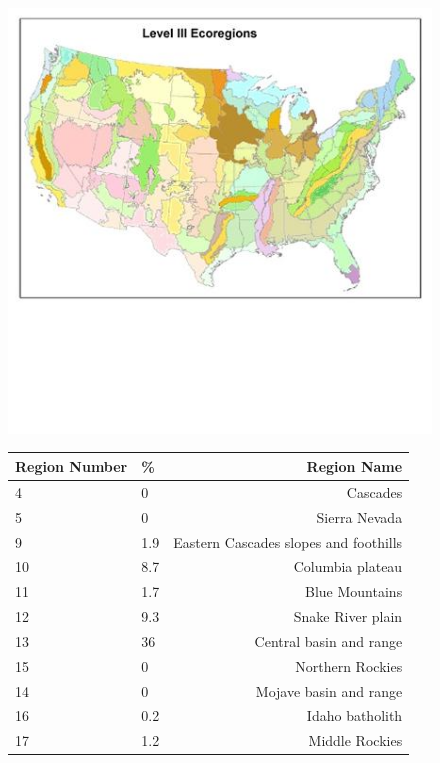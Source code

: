 \def\year{2017}\relax \documentclass[letterpaper]{article}
\begin{document}
  \begin{figure}
  \begin{minipage}[b]{0.49\textwidth}
    \centering
\includegraphics[width=\textwidth]{pics/ecoregions.jpg}
 \label{fig:ecoregion}
  \end{minipage}
  \hfill
  \begin{minipage}[b]{0.49\textwidth}
    \centering
   \begin{tabularx}{\linewidth}{l l r}
		\toprule[.2em]
		Region Number&\%&Region Name\\
		\midrule
		4&0&Cascades\\
		5&0&Sierra Nevada\\
		9&1.9&Eastern Cascades slopes and foothills\\
		10&8.7&Columbia plateau\\
		11&1.7&Blue Mountains\\
		12&9.3&Snake River plain\\
		13&36&Central basin and range\\
		15&0&Northern Rockies\\
		14&0&Mojave basin and range\\
		16&0.2&Idaho batholith\\
		17&1.2&Middle Rockies\\

\end{tabularx}
\end{minipage}
\end{figure}
\end{document}

